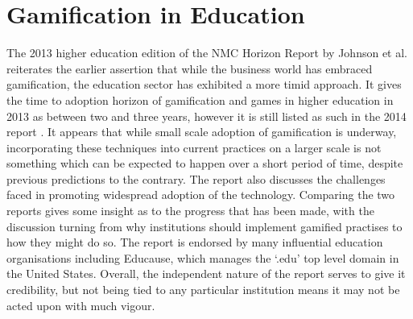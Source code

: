 \documentclass[12pt,a4paper,twoside]{report}
\begin{document}
\section{Gamification in Education}
The 2013 higher education edition of the NMC Horizon Report by Johnson et al. \cite{johnson2013nmc} reiterates the earlier assertion that while the business world has embraced gamification, the education sector has exhibited a more timid approach. It gives the time to adoption horizon of gamification and games in higher education in 2013 as between two and three years, however it is still listed as such in the 2014 report \cite{johnson2014nmc}. It appears that while small scale adoption of gamification is underway, incorporating these techniques into current practices on a larger scale is not something which can be expected to happen over a short period of time, despite previous predictions to the contrary. The report also discusses the challenges faced in promoting widespread adoption of the technology. Comparing the two reports gives some insight as to the progress that has been made, with the discussion turning from why institutions should implement gamified practises to how they might do so. The report is endorsed by many influential education organisations including Educause, which manages the `.edu' top level domain in the United States.  Overall, the independent nature of the report serves to give it credibility, but not being tied to any particular institution means it may not be acted upon with much vigour.
\end{document}
